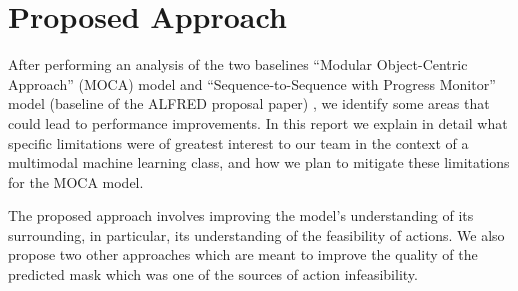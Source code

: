 \documentclass[11pt,a4paper]{article}
\begin{document}


\section{Proposed Approach}

After performing an analysis of the two baselines ``Modular Object-Centric Approach'' (MOCA) \citep{singh2020moca} model and  ``Sequence-to-Sequence with Progress Monitor'' model (baseline of the ALFRED proposal paper) \citep{ALFRED20}, we identify some areas that could lead to performance improvements. In this report we explain in detail what specific limitations were of greatest interest to our team in the context of a multimodal machine learning class, and how we plan to mitigate these limitations for the MOCA model.  

The proposed approach involves improving the model's understanding of its surrounding, in particular, its understanding of the feasibility of actions. We also propose two other approaches which are meant to improve the quality of the predicted mask which was one of the sources of action infeasibility.
\end{document}
